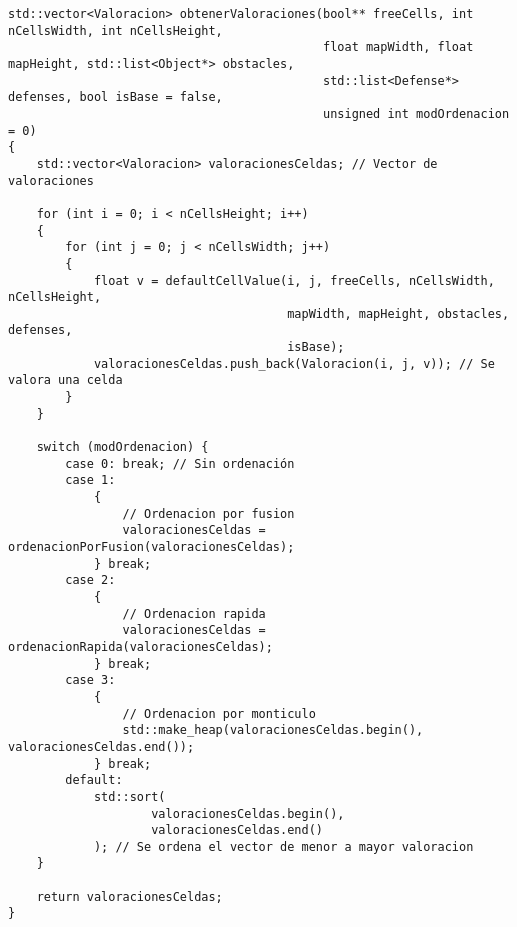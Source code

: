 \lstset{language=C++, texcl=true}
\begin{lstlisting}[frame=single]
std::vector<Valoracion> obtenerValoraciones(bool** freeCells, int nCellsWidth, int nCellsHeight,
                                            float mapWidth, float mapHeight, std::list<Object*> obstacles,
                                            std::list<Defense*> defenses, bool isBase = false,
                                            unsigned int modOrdenacion = 0)
{
    std::vector<Valoracion> valoracionesCeldas; // Vector de valoraciones
    
    for (int i = 0; i < nCellsHeight; i++)
    {
        for (int j = 0; j < nCellsWidth; j++)
        {
            float v = defaultCellValue(i, j, freeCells, nCellsWidth, nCellsHeight,
                                       mapWidth, mapHeight, obstacles, defenses,
                                       isBase);
            valoracionesCeldas.push_back(Valoracion(i, j, v)); // Se valora una celda
        }
    }
    
    switch (modOrdenacion) {
        case 0: break; // Sin ordenación
        case 1:
            {
                // Ordenacion por fusion
                valoracionesCeldas = ordenacionPorFusion(valoracionesCeldas);
            } break;
        case 2:
            {
                // Ordenacion rapida
                valoracionesCeldas = ordenacionRapida(valoracionesCeldas);
            } break;
        case 3:
            {
                // Ordenacion por monticulo
                std::make_heap(valoracionesCeldas.begin(), valoracionesCeldas.end());
            } break;
        default:
            std::sort(
                    valoracionesCeldas.begin(),
                    valoracionesCeldas.end()
            ); // Se ordena el vector de menor a mayor valoracion
    }
    
    return valoracionesCeldas;
}
\end{lstlisting}
